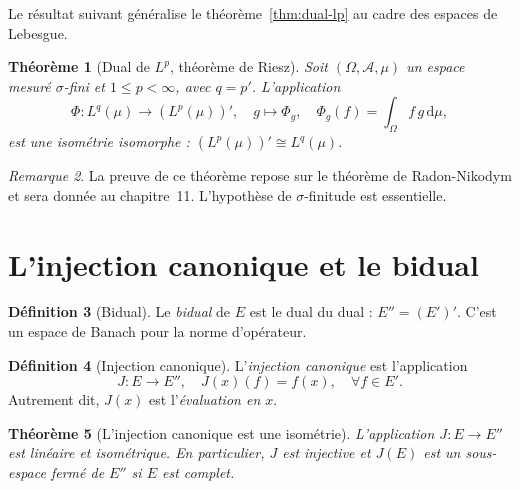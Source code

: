 \documentclass[a4paper,12pt]{book}
\newcommand{\dd}{\mathrm{d}}
\theoremstyle{definition}
\newtheorem{definition}{Définition}[chapter]
\theoremstyle{plain}
\newtheorem{theoreme}[definition]{Théorème}
\theoremstyle{remark}
\newtheorem{remarque}[definition]{Remarque}
\begin{document}

Le résultat suivant généralise le théorème~\ref{thm:dual-lp} au cadre des espaces
de Lebesgue.

\begin{theoreme}[{Dual de $L^p$, théorème de Riesz}]
\label{thm:dual-Lp}
Soit $(\Omega, \mathcal{A}, \mu)$ un espace mesuré $\sigma$-fini
et $1 \le p < \infty$, avec $q = p'$.
L'application
\[
  \Phi : L^q(\mu) \longrightarrow (L^p(\mu))', \quad
  g \longmapsto \Phi_g, \quad
  \Phi_g(f) = \int_\Omega f \, g \, \dd\mu,
\]
est une isométrie isomorphe : $(L^p(\mu))' \cong L^q(\mu)$.
\end{theoreme}

\begin{remarque}
La preuve de ce théorème repose sur le théorème de Radon-Nikodym
et sera donnée au chapitre~11. L'hypothèse de $\sigma$-finitude
est essentielle.
\end{remarque}


\section{L'injection canonique et le bidual}
\label{sec:injection-canonique-bidual}


\begin{definition}[Bidual]
\label{def:bidual}
Le \emph{bidual} de $E$ est le dual du dual : $E'' = (E')'$.
C'est un espace de Banach pour la norme d'opérateur.
\end{definition}

\begin{definition}[Injection canonique]
\label{def:injection-canonique}
L'\emph{injection canonique} est l'application
\[
  J : E \longrightarrow E'', \quad
  J(x)(f) = f(x), \quad \forall f \in E'.
\]
Autrement dit, $J(x)$ est l'\emph{évaluation en $x$}.
\end{definition}

\begin{theoreme}[L'injection canonique est une isométrie]
\label{thm:J-isometrie}
L'application $J : E \to E''$ est linéaire et isométrique. En particulier,
$J$ est injective et $J(E)$ est un sous-espace fermé de $E''$ si $E$ est complet.
\end{theoreme}
\end{document}
